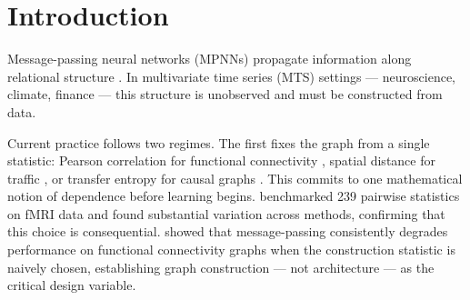 \documentclass{article}
\theoremstyle{plain}
\begin{document}

\printAffiliationsAndNotice{}

\begin{abstract}
Graph neural networks for multivariate time series require a relational graph that is rarely given. We parameterise graph construction over a vocabulary of $K \approx 125$ named pairwise statistics --- causal, spectral, linear, information-theoretic --- computed via \texttt{pyspi} \citep{cliff2023}. A learned weight vector $\mathbf{w}$, jointly optimised with a message-passing network, selects which statistical notion of coupling is task-relevant and produces an interpretable statistical signature of the relational structure. We show that symmetric construction operators cannot distinguish Markov-equivalent topologies, and confirm this empirically: symmetric baselines remain at or below 59\% on a synthetic classification task while vocabulary-based models achieve near-perfect accuracy. The learned $\mathbf{w}$ recovers spectral Granger causality as the dominant coupling mode, matching the generating process.
\end{abstract}

\section{Introduction}
\label{sec:intro}

Message-passing neural networks (MPNNs) propagate information along relational structure \citep{gilmer2017,battaglia2018}. In multivariate time series (MTS) settings --- neuroscience, climate, finance --- this structure is unobserved and must be constructed from data.

Current practice follows two regimes. The first fixes the graph from a single statistic: Pearson correlation for functional connectivity \citep{bullmore2009}, spatial distance for traffic \citep{li2018dcrnn}, or transfer entropy for causal graphs \citep{duan2023}. This commits to one mathematical notion of dependence before learning begins. \citet{liu2025} benchmarked 239 pairwise statistics on fMRI data and found substantial variation across methods, confirming that this choice is consequential. \citet{qi2025} showed that message-passing consistently degrades performance on functional connectivity graphs when the construction statistic is naively chosen, establishing graph construction --- not architecture --- as the critical design variable.
\end{document}
